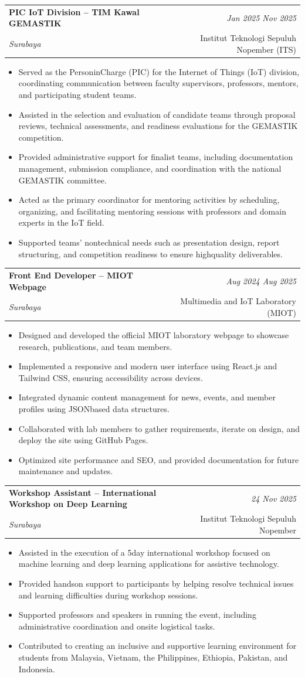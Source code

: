 \documentclass[a4paper,11pt]{article}
\makeatletter
\newcommand{\resumeSubheading}[4]{
\vspace{0.5mm}\item
    \begin{tabular*}{0.98\textwidth}[t]{l@{\extracolsep{\fill}}r}
        \textbf{#1} & \textit{\footnotesize{#4}} \\
        \textit{\footnotesize{#3}} &  \footnotesize{#2}\\
    \end{tabular*}
    \vspace{-2.4mm}
}
\newcommand{\resumeItemListStart}{\begin{justify}\begin{itemize}[leftmargin=3ex, rightmargin=2ex, noitemsep,labelsep=1.2mm,itemsep=0mm]\small}
\newcommand{\resumeItemListEnd}{\end{itemize}\end{justify}\vspace{-2mm}}
\makeatother
\begin{document}
\resumeSubheading
{PIC IoT Division – TIM Kawal GEMASTIK}{Institut Teknologi Sepuluh Nopember (ITS)}
{Surabaya}{Jan 2025 \- Nov 2025}
\resumeItemListStart
\item {Served as the Person\-in\-Charge (PIC) for the Internet of Things (IoT) division, coordinating communication between faculty supervisors, professors, mentors, and participating student teams.}
\item {Assisted in the selection and evaluation of candidate teams through proposal reviews, technical assessments, and readiness evaluations for the GEMASTIK competition.}
\item {Provided administrative support for finalist teams, including documentation management, submission compliance, and coordination with the national GEMASTIK committee.}
\item {Acted as the primary coordinator for mentoring activities by scheduling, organizing, and facilitating mentoring sessions with professors and domain experts in the IoT field.}
\item {Supported teams’ non\-technical needs such as presentation design, report structuring, and competition readiness to ensure high\-quality deliverables.}
\resumeItemListEnd

\newpage
\resumeSubheading
{Front End Developer – MIOT Webpage}
{Multimedia and IoT Laboratory (MIOT)}
{Surabaya}{Aug 2024\- Aug 2025}
\resumeItemListStart
\item {Designed and developed the official MIOT laboratory webpage to showcase research, publications, and team members.}
\item {Implemented a responsive and modern user interface using React.js and Tailwind CSS, ensuring accessibility across devices.}
\item {Integrated dynamic content management for news, events, and member profiles using JSON\-based data structures.}
\item {Collaborated with lab members to gather requirements, iterate on design, and deploy the site using GitHub Pages.}
\item {Optimized site performance and SEO, and provided documentation for future maintenance and updates.}
\resumeItemListEnd
\vspace{-4mm}

\resumeSubheading
{Workshop Assistant – International Workshop on Deep Learning}
{Institut Teknologi Sepuluh Nopember}{Surabaya}
{24 \- 29 Nov 2025}

\resumeItemListStart
\item {Assisted in the execution of a 5\-day international workshop focused on machine learning and deep learning applications for assistive technology.}
\item {Provided hands\-on support to participants by helping resolve technical issues and learning difficulties during workshop sessions.}
\item {Supported professors and speakers in running the event, including administrative coordination and on\-site logistical tasks.}
\item {Contributed to creating an inclusive and supportive learning environment for students from Malaysia, Vietnam, the Philippines, Ethiopia, Pakistan, and Indonesia.}
\resumeItemListEnd
\end{document}
